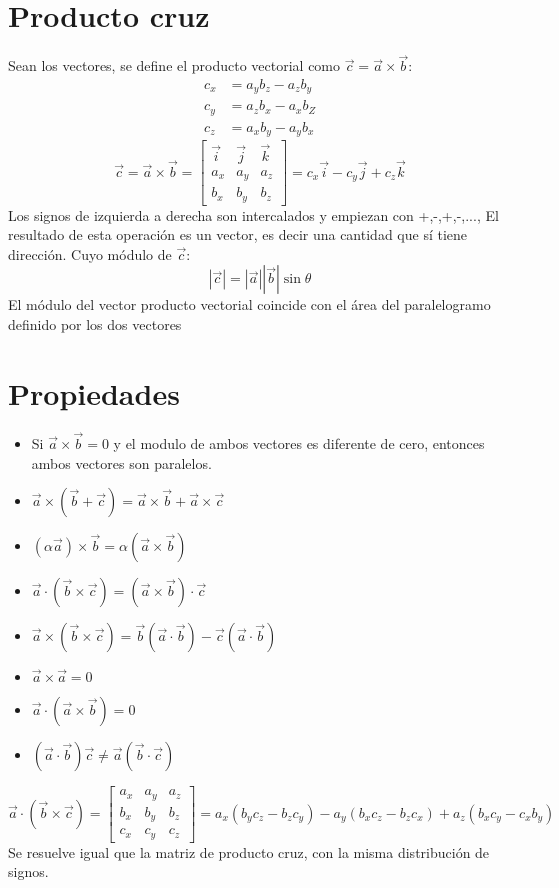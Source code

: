 \documentclass[
	12pt, %
	fleqn, %
	a4paper, %
	oneside, %
]{LegrandOrangeBook}
\begin{document}
\section{Producto cruz}
Sean los vectores, se define el producto vectorial como $\vec{c}=\vec{a}\times\vec{b}$:
\begin{align*}
c_x&=a_yb_z - a_zb_y\\
c_y&=a_zb_x - a_xb_Z\\
c_z&=a_xb_y - a_yb_x
\end{align*}
\begin{equation}
\vec{c}=\vec{a}\times\vec{b}=
\begin{bmatrix}
     \vec{i} & \vec{j} & \vec{k}\\
     a_x & a_y & a_z\\
     b_x & b_y & b_z
   \end{bmatrix}
=c_x\vec{i}-c_y\vec{j}+c_z\vec{k}
\end{equation}
Los signos de izquierda a derecha son intercalados y empiezan con +,-,+,-,...,
El resultado de esta operación es un vector, es decir una cantidad que sí tiene dirección. 
Cuyo módulo de $\vec{c}$:
\begin{equation}
|\vec{c}|=|\vec{a}||\vec{b}|\sin\theta
\end{equation}
El módulo del vector producto vectorial coincide con el área del paralelogramo definido por los dos vectores
\section{Propiedades}
\begin{itemize}
\item Si $\vec{a}\times\vec{b}=0$ y el modulo de ambos vectores es diferente de cero, entonces ambos vectores son paralelos.
\item $\vec{a}\times(\vec{b}+\vec{c})=\vec{a}\times\vec{b}+\vec{a}\times\vec{c}$
\item $(\alpha\vec{a})\times\vec{b}=\alpha(\vec{a}\times\vec{b})$
\item $\vec{a}\cdot(\vec{b}\times\vec{c})=(\vec{a}\times\vec{b})\cdot\vec{c}$
\item $\vec{a}\times(\vec{b}\times\vec{c})=\vec{b}(\vec{a}\cdot\vec{b}) - \vec{c}(\vec{a}\cdot\vec{b})$
\item $\vec{a}\times\vec{a}=0$
\item $\vec{a}\cdot(\vec{a}\times\vec{b})=0	$
\item $(\vec{a}\cdot\vec{b})\vec{c}\neq\vec{a}(\vec{b}\cdot\vec{c})$
\end{itemize}
\begin{equation}
\vec{a}\cdot(\vec{b}\times\vec{c})=
\begin{bmatrix}
     a_x & a_y & a_z\\
     b_x & b_y & b_z\\
     c_x & c_y & c_z
   \end{bmatrix}
=a_x(b_yc_z-b_zc_y)-a_y(b_xc_z-b_zc_x)+a_z(b_xc_y-c_xb_y)
\end{equation}
Se resuelve igual que la matriz de producto cruz, con la misma distribución de signos.
\end{document}

